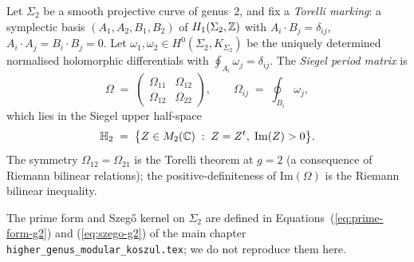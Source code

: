 Let $\Sigma_2$ be a smooth projective curve of genus~$2$, and
fix a \emph{Torelli marking}: a symplectic basis
$(A_1, A_2, B_1, B_2)$ of $H_1(\Sigma_2,\mathbb{Z})$ with
$A_i\cdot B_j = \delta_{ij}$, $A_i\cdot A_j = B_i\cdot B_j = 0$.
Let $\omega_1, \omega_2 \in H^0(\Sigma_2, K_{\Sigma_2})$ be the
uniquely determined normalised holomorphic differentials
with $\oint_{A_i}\omega_j = \delta_{ij}$. The \emph{Siegel
period matrix} is
\begin{equation}\label{eq:g2p-siegel}
 \Omega \;=\;
 \begin{pmatrix}
 \Omega_{11} & \Omega_{12} \\
 \Omega_{12} & \Omega_{22}
 \end{pmatrix},
 \qquad
 \Omega_{ij} \;=\; \oint_{B_i}\omega_j,
\end{equation}
which lies in the Siegel upper half-space
\begin{equation}\label{eq:g2p-H2}
 \mathbb{H}_2 \;=\;
 \bigl\{ Z \in M_2(\mathbb{C}) \;:\; Z = Z^t,\;
 \mathrm{Im}(Z) > 0 \bigr\}.
\end{equation}
The symmetry $\Omega_{12}=\Omega_{21}$ is the Torelli theorem
at $g=2$ (a consequence of Riemann bilinear relations); the
positive-definiteness of $\mathrm{Im}(\Omega)$ is the Riemann
bilinear inequality.

The prime form and Szeg\H{o} kernel on $\Sigma_2$ are defined in
Equations~(\ref{eq:prime-form-g2}) and
(\ref{eq:szego-g2}) of the main chapter
\texttt{higher\_genus\_modular\_koszul.tex}; we do not reproduce
them here.

